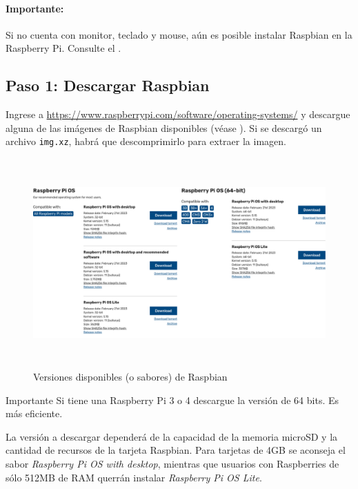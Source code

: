 \documentclass[letterpaper,10.5pt]{article}
\begin{document}
\paragraph*{Importante:} Si no cuenta con monitor, teclado y mouse, aún es posible instalar Raspbian en la Raspberry Pi. Consulte el .

%
%
\subsection{Paso 1: Descargar Raspbian}%
\label{sec:step1}
Ingrese a \url{https://www.raspberrypi.com/software/operating-systems/} y descargue alguna de las imágenes de Raspbian disponibles (véase ). Si se descargó un archivo \texttt{img.xz}, habrá que descomprimirlo para extraer la imagen.

\begin{figure}
	\centering%
	\includegraphics[width=0.8\columnwidth,height=8cm,keepaspectratio]{img/p01-01.png} %
	\caption{Versiones disponibles (o sabores) de Raspbian}
	\label{fig:raspbian-flavors} %
\end{figure}

\begin{greenbox}{Importante}
Si tiene una Raspberry Pi 3 o 4 descargue la versión de 64 bits. Es más eficiente.
\end{greenbox}

La versión a descargar dependerá de la capacidad de la memoria microSD y la cantidad de recursos de la tarjeta Raspbian.
Para tarjetas de 4GB se aconseja el sabor \emph{Raspberry Pi OS with desktop}, mientras que usuarios con Raspberries de sólo 512MB de RAM querrán instalar \emph{Raspberry Pi OS Lite}.
\end{document}
